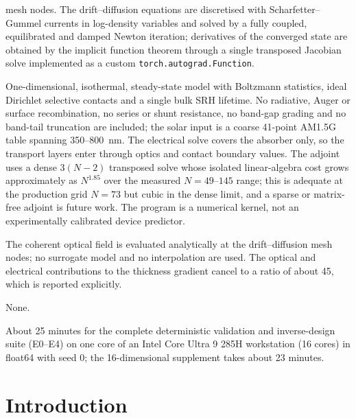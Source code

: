\documentclass[preprint,12pt]{elsarticle}
\begin{document}
\begin{description}
mesh nodes. The drift--diffusion equations are discretised with
Scharfetter--Gummel currents in log-density variables and solved by a fully
coupled, equilibrated and damped Newton iteration; derivatives of the
converged state are obtained by the implicit function theorem through a
single transposed Jacobian solve implemented as a custom
\texttt{torch.autograd.Function}.
\item[Restrictions:] One-dimensional, isothermal, steady-state model with
Boltzmann statistics, ideal Dirichlet selective contacts and a single bulk
SRH lifetime. No radiative, Auger or surface recombination, no series or
shunt resistance, no band-gap grading and no band-tail truncation are
included; the solar input is a coarse 41-point AM1.5G table spanning
350--800~nm. The electrical solve covers the absorber only, so the transport
layers enter through optics and contact boundary values. The adjoint uses a
dense $3(N-2)$ transposed solve whose isolated linear-algebra cost grows
approximately as $N^{1.85}$ over the measured $N=49$--$145$ range;
this is adequate at the production grid $N=73$ but cubic in the dense limit,
and a sparse or matrix-free adjoint is future work. The program is a
numerical kernel, not an experimentally calibrated device predictor.
\item[Unusual features:] The coherent optical field is evaluated analytically
at the drift--diffusion mesh nodes; no surrogate model and no interpolation
are used. The optical and electrical contributions to the thickness gradient
cancel to a ratio of about 45, which is reported explicitly.
\item[Additional comments:] None.
\item[Running time:] About 25 minutes for the complete deterministic
validation and inverse-design suite (E0--E4) on one core of an Intel Core
Ultra 9 285H workstation (16 cores) in float64 with seed 0; the
16-dimensional supplement takes about 23 minutes.
\end{description}


\section{Introduction}
\label{sec:intro}
\end{document}
